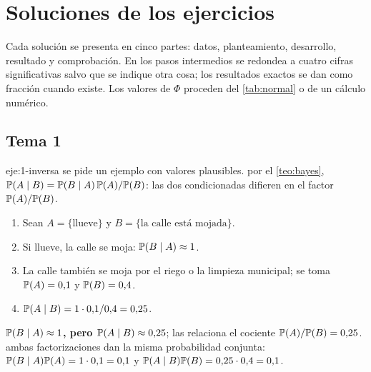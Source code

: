 \chapter{Soluciones de los ejercicios}
\label{ap:soluciones}

Cada solución se presenta en cinco partes: datos, planteamiento, desarrollo, resultado y comprobación. En los pasos intermedios se redondea a cuatro cifras significativas salvo que se indique otra cosa; los resultados exactos se dan como fracción cuando existe. Los valores de $\Phi$ proceden del \cref{tab:normal} o de un cálculo numérico.

\section{Tema 1}

\begin{solucion}{eje:1-inversa}
\datos se pide un ejemplo con valores plausibles.
\planteamiento por el \cref{teo:bayes}, $\mathbb{P}(A\mid B)=\mathbb{P}(B\mid A)\,\mathbb{P}(A)/\mathbb{P}(B)$: las dos condicionadas difieren en el factor $\mathbb{P}(A)/\mathbb{P}(B)$.
\pasos
\begin{enumerate}[label=\arabic*.]
  \item Sean $A=\{\text{llueve}\}$ y $B=\{\text{la calle está mojada}\}$.
  \item Si llueve, la calle se moja: $\mathbb{P}(B\mid A)\approx 1$.
  \item La calle también se moja por el riego o la limpieza municipal; se toma $\mathbb{P}(A)=0{,}1$ y $\mathbb{P}(B)=0{,}4$.
  \item $\mathbb{P}(A\mid B)=1\cdot 0{,}1/0{,}4=0{,}25$.
\end{enumerate}
\resultado \textbf{$\mathbb{P}(B\mid A)\approx 1$, pero $\mathbb{P}(A\mid B)\approx 0{,}25$}; las relaciona el cociente $\mathbb{P}(A)/\mathbb{P}(B)=0{,}25$.
\comprobacion ambas factorizaciones dan la misma probabilidad conjunta: $\mathbb{P}(B\mid A)\mathbb{P}(A)=1\cdot 0{,}1=0{,}1$ y $\mathbb{P}(A\mid B)\mathbb{P}(B)=0{,}25\cdot 0{,}4=0{,}1$.
\end{solucion}

